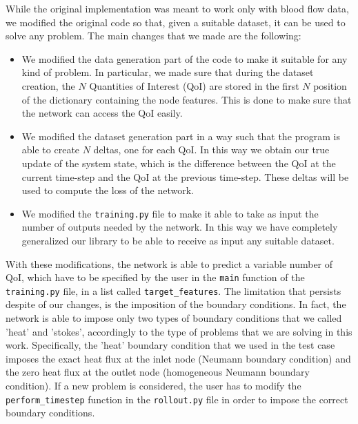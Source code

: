 \documentclass[11pt,a4paper]{article}
\begin{document}
While the original implementation was meant to work only with blood flow data, we modified the original code so that, given a suitable dataset, it can be used to solve any problem. The main changes that we made are the following:
\begin{itemize}
    \item We modified the data generation part of the code to make it suitable for any kind of problem. In particular, we made sure that during the dataset creation, the \(N\) Quantities of Interest (QoI) are stored in the first \(N\) position of the dictionary containing the node features. This is done to make sure that the network can access the QoI easily. 
    \item We modified the dataset generation part in a way such that the program is able to create \(N\) deltas, one for each QoI. In this way we obtain our true update of the system state, which is the difference between the QoI at the current time-step and the QoI at the previous time-step. These deltas will be used to compute the loss of the network. 
    \item We modified the \texttt{training.py} file to make it able to take as input the number of outputs needed by the network. In this way we have completely generalized our library to be able to receive as input any suitable dataset.
\end{itemize}

With these modifications, the network is able to predict a variable number of QoI, which have to be specified by the user in the \texttt{main} function of the \texttt{training.py} file, in a list called \texttt{target\_features}. 
The limitation that persists despite of our changes, is the imposition of the boundary conditions. In fact, the network is able to impose only two types of boundary conditions that we called 'heat' and 'stokes', accordingly to the type of problems that we are solving in this work. Specifically, the 'heat' boundary condition that we used in the test case imposes the exact heat flux at the inlet node (Neumann boundary condition) and the zero heat flux at the outlet node (homogeneous Neumann boundary condition). If a new problem is considered, the user has to modify the \texttt{perform\_timestep} function in the \texttt{rollout.py} file in order to impose the correct boundary conditions.
    
\end{document}
